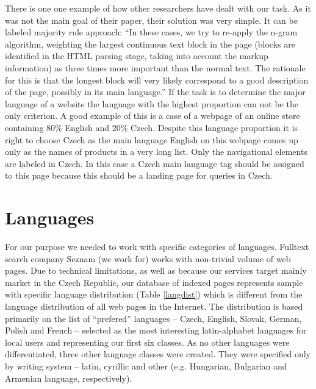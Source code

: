 \documentclass{acm_proc_article-sp}
\begin{document}
  
  There is one one example of how other researchers have dealt with our task. As it was not the main goal of 
  their paper, their solution was very simple. It can be labeled majority rule approach:
  “In these cases, we try to re-apply the n-gram algorithm, weighting the largest continuous text block in the page 
  (blocks are identified in the HTML parsing stage, taking into account the markup information) as three times more important 
  than the normal text. The rationale for this is that the longest block will very likely correspond to a good description 
  of the page, possibly in its main language.” \cite{Martins:langidentweb} If the task is to determine the major language of a website 
  the language with the highest proportion can not be the only criterion. A good example of this is a case of a webpage of an online store
  containing 80\% English and 20\% Czech. Despite this language proportion it is right to choose Czech as the main language
  English on this webpage comes up only as the names of products in a very long list. Only the navigational elements are labeled in Czech. In this case 
  a Czech main language tag should be assigned to this page because this should be a landing page for queries in Czech.

\section{Languages}

  For our purpose we needed to work with specific categories of languages.
  Fulltext search company Seznam (we work for) works with non-trivial volume of web pages.
  Due to technical limitations, as well as because our services target mainly market in the Czech Republic,
  our database of indexed pages represents sample with specific language distribution (Table \ref{langdist}) which is different from the
  language distribution of all web pages in the Internet.
  The distribution is based primarily on the list of ``prefered'' languages –
  Czech, English, Slovak, German, Polish and French –
  selected as the most interesting latin-alphabet languages for local users and representing  our first six classes.
  As no other languages were differentiated, three other language classes were created. They were specified only by writing system
  – latin, cyrillic and other (e.g. Hungarian, Bulgarian and Armenian language, respectively).
\end{document}
